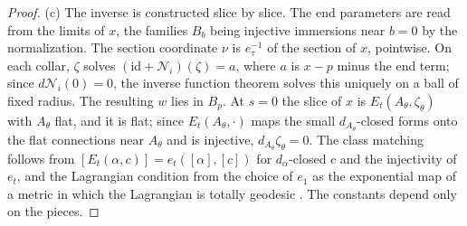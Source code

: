 \documentclass[11pt]{amsart}
\theoremstyle{definition}
\theoremstyle{remark}
\theoremstyle{plain}
\numberwithin{equation}{section}
\begin{document}
\begin{proof}
(c) The inverse is constructed slice by slice. The end parameters are read
from the limits of $x$, the families $B_b$ being injective immersions near
$b=0$ by the normalization. The section coordinate $\nu$ is $e_\tau^{-1}$ of the
section of $x$, pointwise. On each collar, $\zeta$ solves
$(\mathrm{id}+\mathcal N_i)(\zeta)=a$, where $a$ is $x-p$ minus the end term; since
$d\mathcal N_i(0)=0$, the inverse function theorem solves this uniquely on a ball
of fixed radius. The resulting $w$ lies in $B_p$. At $s=0$ the slice of $x$ is
$E_t(A_\theta,\zeta_\theta)$ with $A_\theta$ flat, and it is flat; since
$E_t(A_\theta,\cdot)$ maps the small $d_{A_\theta}$-closed forms onto the flat
connections near $A_\theta$ and is injective, $d_{A_\theta}\zeta_\theta=0$. The class
matching follows from $[E_t(\alpha,c)]=e_t([\alpha],[c])$ for $d_\alpha$-closed $c$
and the injectivity of $e_t$, and the Lagrangian condition from the choice of
$e_1$ as the exponential map of a metric in which the Lagrangian is totally
geodesic \cite[Lemma~4.4 and its proof]{DFL}. The constants depend only on the
pieces.
\end{proof}
\end{document}

